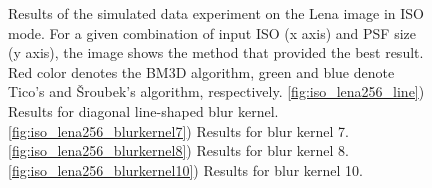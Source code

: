 \documentclass[12pt,notitlepage]{report}
\begin{document}
\begin{figure}[htb]
  \caption[Simulated-data experiment on the Lena image in ISO mode]{Results of the simulated data experiment on the Lena image in ISO mode. For a given combination of input ISO (x axis) and PSF size (y axis), the image shows the method that provided the best result. Red color denotes the BM3D algorithm, green and blue denote Tico's and Šroubek's algorithm, respectively. \ref{fig:iso_lena256_line}) Results for diagonal line-shaped blur kernel. \ref{fig:iso_lena256_blurkernel7}) Results for blur kernel 7. \ref{fig:iso_lena256_blurkernel8}) Results for blur kernel 8. \ref{fig:iso_lena256_blurkernel10}) Results for blur kernel 10.}
  \label{fig:iso_lena256}
\end{figure}

\clearpage
\end{document}
